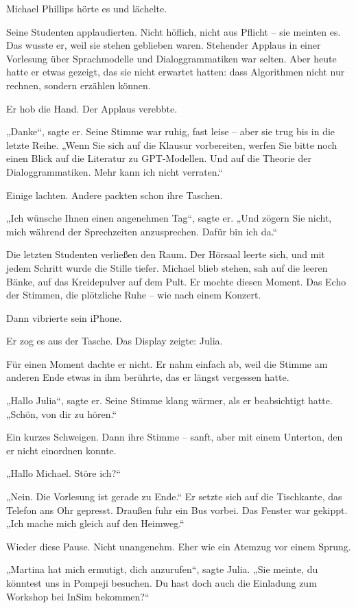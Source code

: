 \documentclass[
]{article}
\begin{document}
Michael Phillips hörte es und lächelte.

Seine Studenten applaudierten. Nicht höflich, nicht aus Pflicht -- sie meinten es. Das wusste er, weil sie stehen geblieben waren. Stehender Applaus in einer Vorlesung über Sprachmodelle und Dialoggrammatiken war selten. Aber heute hatte er etwas gezeigt, das sie nicht erwartet hatten: dass Algorithmen nicht nur rechnen, sondern erzählen können.

Er hob die Hand. Der Applaus verebbte.

„Danke``, sagte er. Seine Stimme war ruhig, fast leise -- aber sie trug bis in die letzte Reihe. „Wenn Sie sich auf die Klausur vorbereiten, werfen Sie bitte noch einen Blick auf die Literatur zu GPT-Modellen. Und auf die Theorie der Dialoggrammatiken. Mehr kann ich nicht verraten.``

Einige lachten. Andere packten schon ihre Taschen.

„Ich wünsche Ihnen einen angenehmen Tag``, sagte er. „Und zögern Sie nicht, mich während der Sprechzeiten anzusprechen. Dafür bin ich da.``

Die letzten Studenten verließen den Raum. Der Hörsaal leerte sich, und mit jedem Schritt wurde die Stille tiefer. Michael blieb stehen, sah auf die leeren Bänke, auf das Kreidepulver auf dem Pult. Er mochte diesen Moment. Das Echo der Stimmen, die plötzliche Ruhe -- wie nach einem Konzert.

Dann vibrierte sein iPhone.

Er zog es aus der Tasche. Das Display zeigte: Julia.

Für einen Moment dachte er nicht. Er nahm einfach ab, weil die Stimme am anderen Ende etwas in ihm berührte, das er längst vergessen hatte.

„Hallo Julia``, sagte er. Seine Stimme klang wärmer, als er beabsichtigt hatte. „Schön, von dir zu hören.``

Ein kurzes Schweigen. Dann ihre Stimme -- sanft, aber mit einem Unterton, den er nicht einordnen konnte.

„Hallo Michael. Störe ich?{\kern0pt}``

„Nein. Die Vorlesung ist gerade zu Ende.`` Er setzte sich auf die Tischkante, das Telefon ans Ohr gepresst. Draußen fuhr ein Bus vorbei. Das Fenster war gekippt. „Ich mache mich gleich auf den Heimweg.``

Wieder diese Pause. Nicht unangenehm. Eher wie ein Atemzug vor einem Sprung.

„Martina hat mich ermutigt, dich anzurufen``, sagte Julia. „Sie meinte, du könntest uns in Pompeji besuchen. Du hast doch auch die Einladung zum Workshop bei InSim bekommen?{\kern0pt}``
\end{document}
